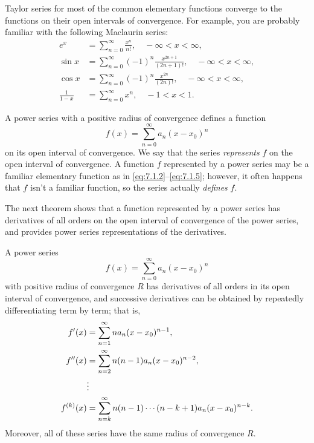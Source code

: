  Taylor series for most of the common elementary
functions converge to the functions on their open intervals of
convergence. For example, you are probably  familiar with the
following Maclaurin series:
\begin{align}
e^x&=\sum_{n=0}^\infty \frac{x^n}{n!},\quad
-\infty<x<\infty,\label{eq:7.1.2}\\
\sin x&=\sum_{n=0}^\infty(-1)^n\frac{x^{2n+1}}{(2n+1)!},\quad
-\infty<x<\infty, \label{eq:7.1.3}\\ %
\cos x&=\sum_{n=0}^\infty(-1)^n\frac{x^{2n}}{(2n)!},\quad
-\infty<x<\infty, \label{eq:7.1.4}\\ %
\frac{1}{1-x}&=\sum_{n=0}^\infty x^n,\quad-1<x<1.\label{eq:7.1.5}
\end{align}



A power series with a positive radius of convergence defines a
function
\[
f(x)=\sum_{n=0}^\infty a_n(x-x_0)^n
\]
on its open interval of convergence. We say that the series
\emph{\color{blue}represents} $f$ on the open interval of convergence.
A function $f$
represented by a power series may be a familiar elementary function
as in  \eqref{eq:7.1.2}--\eqref{eq:7.1.5}; however, it often happens that
$f$ isn't a familiar function, so the series actually
\emph{\color{blue}defines} $f$.

The next theorem shows that a function represented by a power
series has derivatives of all orders on the open interval of
convergence of the power series, and provides power series
representations of the derivatives.

\begin{theorem}\label{thmtype:7.1.4}
A power series
\[
f(x)=\sum_{n=0}^\infty a_n(x-x_0)^n
\]
with positive radius of convergence $R$ has derivatives of all orders
in its open interval of convergence, and successive  derivatives
can be obtained by repeatedly differentiating term by term; that is,
\begin{align}
f'(x)&=\displaystyle{\sum_{n=1}^\infty na_n(x-x_0)^{n-1}}\label{eq:7.1.6},\\
f''(x)&=\displaystyle{\sum_{n=2}^\infty n(n-1)a_n(x-x_0)^{n-2}},\label{eq:7.1.7}\\
&\vdots\nonumber\\
f^{(k)}(x)&=\displaystyle{\sum_{n=k}^\infty
n(n-1)\cdots(n-k+1)a_n(x-x_0)^{n-k}}\label{eq:7.1.8}.
\end{align}
Moreover, all of these series have the same radius of convergence $R$.
\end{theorem}

